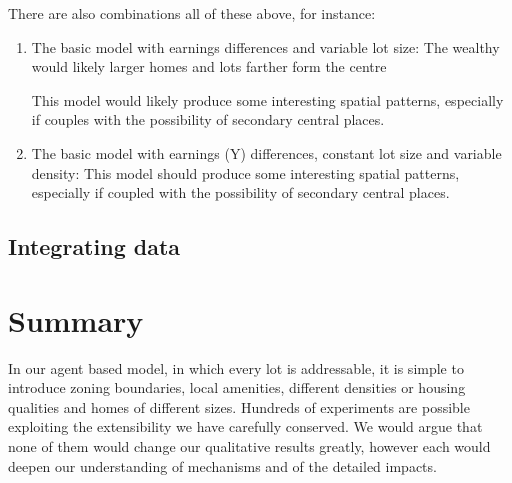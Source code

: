 There are also combinations all of these above, for instance:

\begin{enumerate}

\item  The basic model with earnings differences and variable lot size: 
The wealthy would likely larger homes and lots farther form the centre

This model would likely produce some interesting spatial patterns, especially if couples with the possibility of secondary central places.

\item The basic model with earnings (Y) differences, constant lot size and variable density: This model should produce some interesting spatial patterns, especially if coupled with the possibility of secondary central places.

\end{enumerate}




\subsection{Integrating data}

\section{Summary}
In our agent based model, in which every lot is  addressable, it is simple to introduce zoning boundaries, local amenities, different densities or housing qualities and homes of different sizes. Hundreds of experiments are possible exploiting  the extensibility we have carefully conserved.  
We would argue that none of them would change our qualitative results greatly, however each would deepen our understanding of mechanisms and of the detailed impacts.


